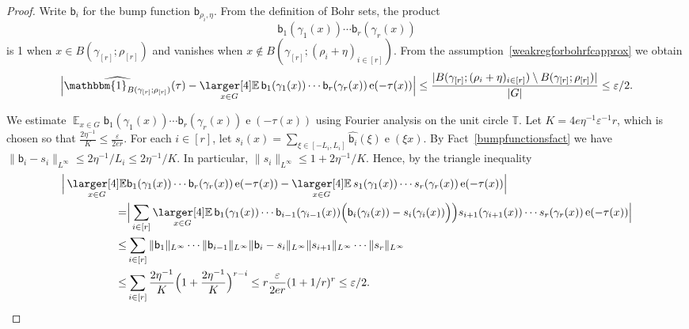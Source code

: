 \documentclass[a4paper,11pt]{article}
\numberwithin{theorem}{section}
\theoremstyle{definition}
\newcommand\id{\mathbbm{1}}
\newcommand{\on}[1]{
	\operatorname{#1}
}
\newcommand\ex{\mathop{\mathbb{E}}}
\newcommand{\exx}{
  \mathop{
    \mathchoice{\vcenter{\hbox{\larger[4]$\mathbb{E}$}}}
               {\kern0pt\mathbb{E}}
               {\kern0pt\mathbb{E}}
               {\kern0pt\mathbb{E}}
  }\displaylimits
}
\begin{document}
\begin{proof}
    Write $\mathsf{b}_i$ for the bump function $\mathsf{b}_{\rho_i, \eta}$. From the definition of Bohr sets, the product
    \[\mathsf{b}_1(\gamma_1(x))\cdots \mathsf{b}_r(\gamma_r(x))\]
    is 1 when $x \in B(\gamma_{[r]}; \rho_{[r]})$ and vanishes when $ x \notin B(\gamma_{[r]}; (\rho_i + \eta)_{i \in [r]})$. From the assumption~\eqref{weakregforbohrfcapprox} we obtain
    \[\Big|\widehat{\id_{B(\gamma_{[r]}; \rho_{[r]})}}(\tau) - \exx_{x \in G} \mathsf{b}_1(\gamma_1(x))\cdots \mathsf{b}_r(\gamma_r(x)) \on{e}(-\tau(x))\Big| \leq \frac{|B(\gamma_{[r]}; (\rho_i + \eta)_{i \in [r]}) \setminus B(\gamma_{[r]}; \rho_{[r]})| }{|G|} \leq \varepsilon/2.\]

    We estimate $\ex_{x \in G} \mathsf{b}_1(\gamma_1(x))\cdots \mathsf{b}_r(\gamma_r(x)) \on{e}(-\tau(x))$ using Fourier analysis on the unit circle $\mathbb{T}$. Let $K = 4 e \eta^{-1} \varepsilon^{-1} r$, which is chosen so that $\frac{2\eta^{-1}}{K} \leq \frac{\varepsilon}{2 e r}$. For each $i \in [r]$, let $s_i(x) = \sum_{\xi \in [-L_i, L_i]} \widehat{\mathsf{b}_i}(\xi) \on{e}(\xi x)$. By Fact~\ref{bumpfunctionsfact} we have $\|\mathsf{b}_i - s_i\|_{L^\infty} \leq 2\eta^{-1}/{L_i} \leq 2\eta^{-1}/K$. In particular, $\|s_i\|_{L^\infty} \leq 1 + 2\eta^{-1}/K$. Hence, by the triangle inequality
    \begin{align*}\Big|\exx_{x \in G} & \mathsf{b}_1(\gamma_1(x))\cdots \mathsf{b}_r(\gamma_r(x)) \on{e}(-\tau(x)) - \exx_{x \in G} s_1(\gamma_1(x))\cdots s_r(\gamma_r(x)) \on{e}(-\tau(x))\Big|\\
    = & \Big|\sum_{i \in [r]} \exx_{x \in G} \mathsf{b}_1(\gamma_1(x))\cdots \mathsf{b}_{i - 1}(\gamma_{i-1}(x))\Big(\mathsf{b}_i(\gamma_i(x)) - s_i(\gamma_i(x))\Big)\Big)s_{i + 1}(\gamma_{i + 1}(x))\cdots s_r(\gamma_r(x)) \on{e}(-\tau(x))\Big|\\
    \leq &  \sum_{i \in [r]}  \|\mathsf{b}_1 \|_{L^\infty} \cdots \|\mathsf{b}_{i - 1}\|_{L^\infty} \|\mathsf{b}_i  - s_i \|_{L^\infty} \|s_{i + 1}\|_{L^\infty} \cdots \|s_r \|_{L^\infty}\\
    \leq & \sum_{i \in [r]} \frac{2\eta^{-1}}{K}\Big(1 + \frac{2\eta^{-1}}{K}\Big)^{r - i} \leq r \frac{\varepsilon}{2e r} (1 + 1/r)^r \leq \varepsilon/2.\end{align*}


\end{proof}
\end{document}
